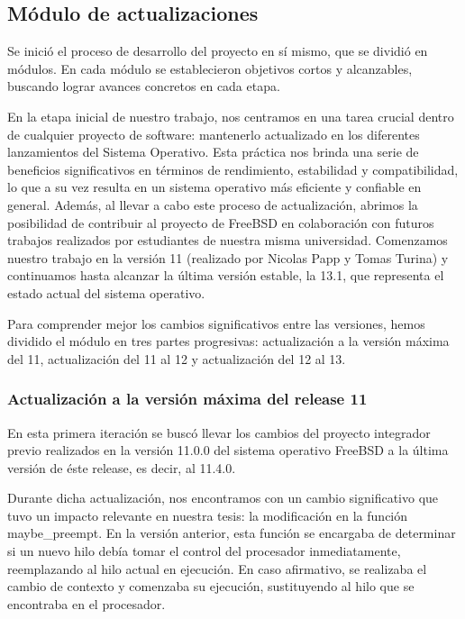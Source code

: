 \subsection{Módulo de actualizaciones}
Se inició el proceso de desarrollo del proyecto en sí mismo, que se dividió en módulos. En cada módulo se establecieron objetivos cortos y alcanzables, buscando lograr avances concretos en cada etapa.

En la etapa inicial de nuestro trabajo, nos centramos en una tarea crucial dentro de cualquier proyecto de software: mantenerlo actualizado en los diferentes lanzamientos del Sistema Operativo. Esta práctica nos brinda una serie de beneficios significativos en términos de rendimiento, estabilidad y compatibilidad, lo que a su vez resulta en un sistema operativo más eficiente y confiable en general. Además, al llevar a cabo este proceso de actualización, abrimos la posibilidad de contribuir al proyecto de FreeBSD en colaboración con futuros trabajos realizados por estudiantes de nuestra misma universidad. Comenzamos nuestro trabajo en la versión 11 (realizado por Nicolas Papp y Tomas Turina) y continuamos hasta alcanzar la última versión estable, la 13.1, que representa el estado actual del sistema operativo.\par

Para comprender mejor los cambios significativos entre las versiones, hemos dividido el módulo en tres partes progresivas: actualización a la versión máxima del 11, actualización del 11 al 12 y actualización del 12 al 13.\par


\subsubsection{Actualización a la versión máxima del release 11}

En esta primera iteración se buscó llevar los cambios del proyecto integrador previo realizados en la versión 11.0.0 del sistema operativo FreeBSD a la última versión de éste release, es decir, al 11.4.0.\par

Durante dicha actualización, nos encontramos con un cambio significativo que tuvo un impacto relevante en nuestra tesis: la modificación en la función maybe\_preempt. En la versión anterior, esta función se encargaba de determinar si un nuevo hilo debía tomar el control del procesador inmediatamente, reemplazando al hilo actual en ejecución. En caso afirmativo, se realizaba el cambio de contexto y comenzaba su ejecución, sustituyendo al hilo que se encontraba en el procesador.\par

